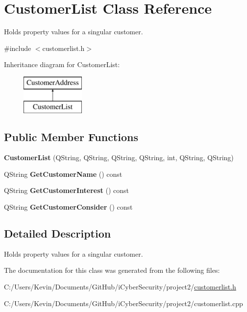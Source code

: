 \hypertarget{class_customer_list}{}\section{Customer\+List Class Reference}
\label{class_customer_list}


Holds property values for a singular customer.  




{\ttfamily \#include $<$customerlist.\+h$>$}

Inheritance diagram for Customer\+List\+:\begin{figure}[H]
\begin{center}
\leavevmode
\includegraphics[height=2.000000cm]{class_customer_list}
\end{center}
\end{figure}
\subsection*{Public Member Functions}
\begin{DoxyCompactItemize}
\item 
\mbox{\label{class_customer_list_a7d4dd3e97f8f4f0ffe4c4e78e8287961}} 
{\bfseries Customer\+List} (Q\+String, Q\+String, Q\+String, Q\+String, int, Q\+String, Q\+String)
\item 
\mbox{\label{class_customer_list_a1664cba8e8d632f423af29173d7f129d}} 
Q\+String {\bfseries Get\+Customer\+Name} () const
\item 
\mbox{\label{class_customer_list_ad9c2e6078f443188109172ba3aa194f2}} 
Q\+String {\bfseries Get\+Customer\+Interest} () const
\item 
\mbox{\label{class_customer_list_a0b5b29392131069645ec640754442134}} 
Q\+String {\bfseries Get\+Customer\+Consider} () const
\end{DoxyCompactItemize}


\subsection{Detailed Description}
Holds property values for a singular customer. 

The documentation for this class was generated from the following files\+:\begin{DoxyCompactItemize}
\item 
C\+:/\+Users/\+Kevin/\+Documents/\+Git\+Hub/i\+Cyber\+Security/project2/\mbox{\hyperlink{customerlist_8h}{customerlist.\+h}}\item 
C\+:/\+Users/\+Kevin/\+Documents/\+Git\+Hub/i\+Cyber\+Security/project2/customerlist.\+cpp\end{DoxyCompactItemize}
